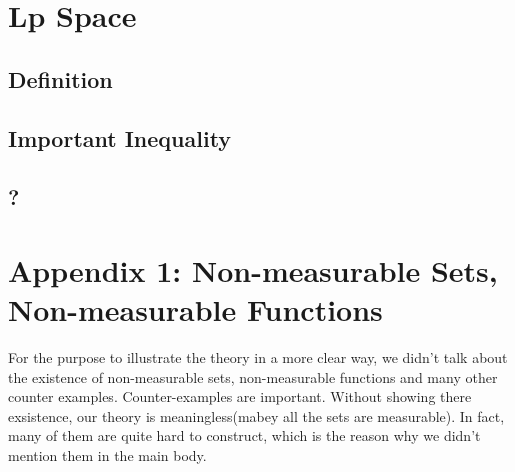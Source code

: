 \documentclass[lang=en, 12pt]{elegantbook}
\begin{document}
    \begin{theorem}
        
    \end{theorem}

    \begin{theorem}
        
    \end{theorem}
    
\chapter{Lp Space}
    \section{Definition}

    \section{Important Inequality}

    \section{?}

\chapter{Appendix 1: Non-measurable Sets, Non-measurable Functions}
    For the purpose to illustrate the theory in a more clear way, we didn't talk about the existence of non-measurable sets, non-measurable functions and many 
other counter examples. Counter-examples are important. Without showing there exsistence, our theory is meaningless(mabey all the sets are 
measurable). In fact, many of them are quite hard to construct, which is the reason why we didn't mention them in the main body.   
\end{document}
